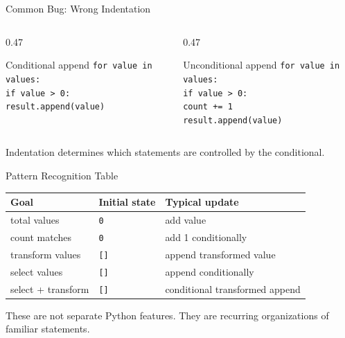 \documentclass[aspectratio=169,10pt]{beamer}
\begin{document}
\begin{frame}{Common Bug: Wrong Indentation}
  \begin{columns}[T,onlytextwidth]
    \begin{column}{0.47\textwidth}
      \begin{block}{Conditional append}
        \texttt{for value in values:}\\
        \hspace{0.18in}\texttt{if value > 0:}\\
        \hspace{0.36in}\texttt{result.append(value)}
      \end{block}
    \end{column}
    \begin{column}{0.47\textwidth}
      \begin{block}{Unconditional append}
        \texttt{for value in values:}\\
        \hspace{0.18in}\texttt{if value > 0:}\\
        \hspace{0.36in}\texttt{count += 1}\\
        \hspace{0.18in}\texttt{result.append(value)}
      \end{block}
    \end{column}
  \end{columns}

  Indentation determines which statements are controlled by the conditional.
\end{frame}

\begin{frame}{Pattern Recognition Table}
  \begin{center}
    \renewcommand{\arraystretch}{1.28}
    \begin{tabular}{l|l|l}
      \textbf{Goal} & \textbf{Initial state} & \textbf{Typical update} \\\hline
      total values & \texttt{0} & add value \\
      count matches & \texttt{0} & add 1 conditionally \\
      transform values & \texttt{[]} & append transformed value \\
      select values & \texttt{[]} & append conditionally \\
      select + transform & \texttt{[]} & conditional transformed append
    \end{tabular}
  \end{center}

  These are not separate Python features. They are recurring organizations of familiar statements.
\end{frame}
\end{document}
